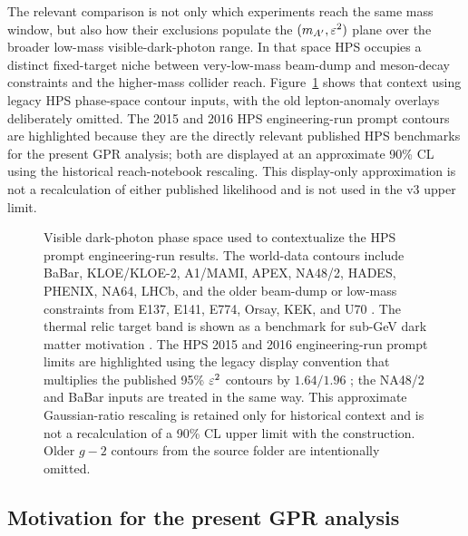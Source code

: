 The relevant comparison is not only which experiments reach the same mass window, but
also how their exclusions populate the $(m_{A^\prime},\varepsilon^2)$ plane over the broader
low-mass visible-dark-photon range. In that space HPS occupies a
distinct fixed-target niche between very-low-mass beam-dump and meson-decay constraints
and the higher-mass collider reach. Figure~\ref{fig:hps-engineering-phase-space}
shows that context using legacy HPS phase-space contour inputs, with the old
lepton-anomaly overlays deliberately omitted. The 2015 and 2016 HPS engineering-run
prompt contours are highlighted because they are the directly relevant published HPS
benchmarks for the present GPR analysis; both are displayed at an approximate 90\% CL
using the historical reach-notebook rescaling. This display-only approximation is not a
recalculation of either published likelihood and is not used in the v3 upper limit.

\begin{figure}[H]
\centering
{}
\caption{Visible dark-photon phase space used to contextualize the HPS prompt
engineering-run results. The world-data contours include BaBar, KLOE/KLOE-2, A1/MAMI,
APEX, NA48/2, HADES, PHENIX, NA64, LHCb, and the older beam-dump or low-mass
constraints from E137, E141, E774, Orsay, KEK, and U70
\cite{BaBarDarkPhoton2014,KLOE2013,KLOE22015,A1MAMI2014,APEX2011,
NA48DarkPhoton2015,HADESDarkPhoton2014,PHENIXDarkPhoton2015,NA64DarkPhoton2018,
NA64X17Visible2021,LHCbDarkPhoton2020,E137BeamDump1988,E141BeamDump1987,
E774BeamDump1991,OrsayBeamDump1989,KEKBeamDump1986,U70DarkPhoton2014}. The thermal
relic target band is shown as a benchmark for sub-GeV dark matter motivation
\cite{EssigEtAl2011}. The HPS 2015 and 2016 engineering-run prompt limits are
highlighted using the legacy display convention that multiplies the published 95\%
$\varepsilon^2$ contours by $1.64/1.96$ \cite{HPS2015DarkPhoton,HPS2016PromptLong}; the
NA48/2 and BaBar inputs are treated in the same way. This approximate Gaussian-ratio
rescaling is retained only for historical context and is not a recalculation of a
90\% CL upper limit with the \CLs{} construction. Older $g-2$ contours from the source
folder are intentionally omitted.}
\label{fig:hps-engineering-phase-space}
\end{figure}

\subsection{Motivation for the present GPR analysis}

